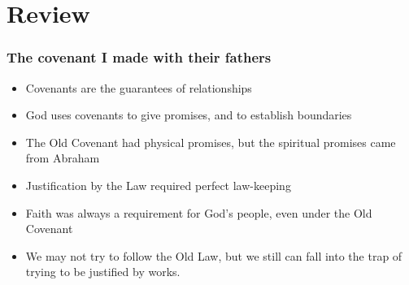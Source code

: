 \section{Review}

\begin{frame}
\frametitle{The covenant I made with their fathers}
	\begin{itemize}
		\item Covenants are the guarantees of relationships
		\item God uses covenants to give promises, and to establish boundaries
		\item The Old Covenant had physical promises, but the spiritual promises came from Abraham
		\item Justification by the Law required perfect law-keeping
		\item Faith was always a requirement for God's people, even under the Old Covenant
		\item We may not try to follow the Old Law, but we still can fall into the trap of trying to be justified by works.
	\end{itemize}

\end{frame}

